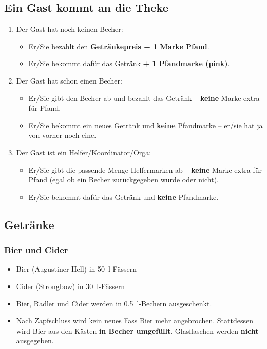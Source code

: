 \subsection{Ein Gast kommt an die Theke}
\begin{enumerate}
  \item Der Gast hat noch keinen Becher:
    \begin{itemize}
      \item Er/Sie bezahlt den \textbf{Getränkepreis + 1 Marke Pfand}.
      \item Er/Sie bekommt dafür das Getränk \textbf{+ 1 Pfandmarke (pink)}.
    \end{itemize}
  \item Der Gast hat schon einen Becher:
    \begin{itemize}
      \item Er/Sie gibt den Becher ab und bezahlt das Getränk -- \textbf{keine} Marke extra für Pfand.
      \item Er/Sie bekommt ein neues Getränk und \textbf{keine} Pfandmarke -- er/sie hat ja von vorher noch eine.
    \end{itemize}
  \item Der Gast ist ein Helfer/Koordinator/Orga:
    \begin{itemize}
      \item Er/Sie gibt die passende Menge Helfermarken ab -- \textbf{keine} Marke extra für Pfand (egal ob ein Becher zurückgegeben wurde oder nicht).
      \item Er/Sie bekommt dafür das Getränk und \textbf{keine} Pfandmarke.
    \end{itemize}
\end{enumerate}
\subsection{Getränke}
\subsubsection{Bier und Cider}
\begin{itemize}
  \item Bier (Augustiner Hell) in \SI{50}{\litre}-Fässern
  \item Cider (Strongbow) in \SI{30}{\litre}-Fässern %
  \item Bier, Radler und Cider werden in \SI{0.5}{\litre}-Bechern ausgeschenkt.
  \item Nach Zapfschluss wird kein neues Fass Bier mehr angebrochen. Stattdessen wird Bier aus den Kästen \textbf{in Becher umgefüllt}. Glasflaschen werden \textbf{nicht} ausgegeben.
\end{itemize}
